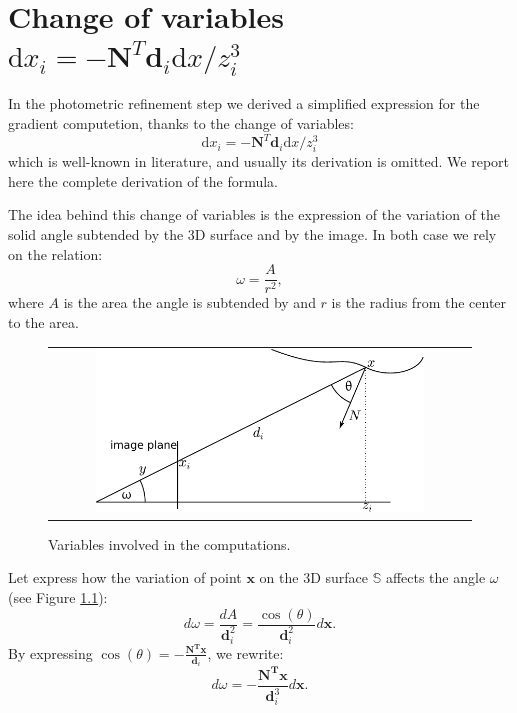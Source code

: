  

\chapter[Change of variables \texorpdfstring{\normalfont  $\textrm{d}x_i = -\mathbf{N}^T \mathbf{d}_i \textrm{d}x/z_i^3$}{}]{Change of variables \\ \texorpdfstring{\normalfont $\textrm{d}x_i = -\mathbf{N}^T \mathbf{d}_i \textrm{d}x/z_i^3$}{}}
\label{app:change}

In the photometric refinement step we derived a simplified expression for the gradient computetion, thanks to the change of variables:
\begin{equation}
 \textrm{d}x_i = -\mathbf{N}^T \mathbf{d}_i \textrm{d}x/z_i^3
\end{equation}
which is well-known in literature, and usually its derivation is omitted.
We report here the complete derivation of the formula.

The idea behind this change of variables is the expression of the variation of the solid angle subtended by the 3D surface and by the image. 
In both case we rely on the relation:
\begin{equation}
    \omega = \frac{A}{r^2},
\end{equation}
where $A$ is the area the angle is subtended by and $r$ is the radius from the center to the area.


\begin{figure}[bt]
 \centering
 \begin{tabular}{c}
  \includegraphics[width=0.8\textwidth]{./img/ch-appendix/change01}\\
 \end{tabular}
 \caption{Variables involved in the computations.}
 \label{fig:change}
\end{figure}

 
Let express how the variation of point $\mathbf{x}$ on the 3D surface $\mathbb{S}$ affects the angle $\omega$ (see Figure \ref{fig:change}):
\begin{equation}
    d\omega = \frac{dA}{\mathbf{d}_i^2} = \frac{\cos(\theta)}{\mathbf{d}_i^2}d\mathbf{x}.
\end{equation}
By expressing $\cos(\theta) = -\frac{\mathbf{N^T x}}{\mathbf{d}_i}$,  we rewrite:
\begin{equation}
\label{eq:change1}
    d\omega  = -\frac{\mathbf{N^T x}}{\mathbf{d}_i^3}d\mathbf{x}.
\end{equation}

